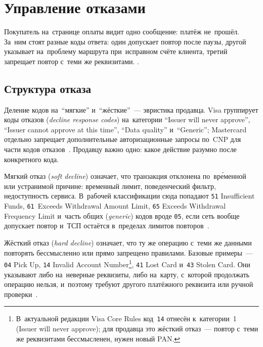 
\chapter{Управление отказами}\label{ch:decline-management}

Покупатель на~странице оплаты видит одно сообщение: платёж не~прошёл.
За~ним стоят разные коды ответа: один допускает повтор после паузы,
другой указывает на~проблему маршрута при~исправном счёте клиента, третий
запрещает повтор с~теми же реквизитами. .

\section{Структура отказа}\label{sec:decline-anatomy}

Деление кодов на~\enquote{мягкие} и~\enquote{жёсткие}~--- эвристика
продавца. Visa группирует коды отказов (\textit{decline response codes})
на~категории \enquote{Issuer will never approve}, \enquote{Issuer cannot
approve at this time}, \enquote{Data quality} и~\enquote{Generic}; Mastercard
отдельно запрещает дополнительные авторизационные запросы по~CNP для части
кодов отказов~\cite{visa-core-rules,mc-tpr}. Продавцу важно одно: какое
действие разумно после конкретного кода.

Мягкий отказ (\textit{soft decline}) означает, что транзакция отклонена
по~вр\'{е}менной или устранимой причине: временный лимит, поведенческий фильтр,
недоступность сервиса. В~рабочей классификации сюда попадают \texttt{51}
Insufficient Funds, \texttt{61}~Exceeds Withdrawal Amount Limit, \texttt{65}
Exceeds Withdrawal Frequency Limit и~часть общих (\textit{generic}) кодов вроде
\texttt{05}, если сеть вообще допускает повтор и~ТСП остаётся в~пределах
лимитов повторов~\cite{visa-core-rules}.

Жёсткий отказ (\textit{hard decline}) означает, что ту же операцию с~теми же
данными повторять бессмысленно или прямо запрещено правилами. Базовые
примеры~--- \texttt{04} Pick Up, \texttt{14} Invalid Account
Number\footnote{В~актуальной редакции Visa Core Rules код~\texttt{14} отнесён
  к~категории~1 (Issuer will never approve); для продавца это жёсткий отказ~---
повтор с~теми же реквизитами бессмысленен, нужен новый PAN.}, \texttt{41} Lost
Card и~\texttt{43} Stolen Card. Они указывают либо на~неверные реквизиты, либо
на~карту, с~которой продолжать операцию нельзя, и~поэтому требуют другого
платёжного реквизита или ручной проверки~\cite{visa-core-rules,mc-tpr}.

